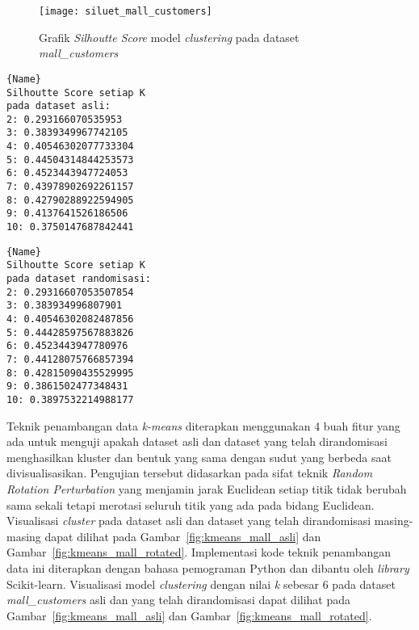 \begin{figure}
	\centering
	\texttt{[image: siluet\_mall\_customers]}
	\caption{Grafik \textit{Silhoutte Score} model \textit{clustering} pada dataset \textit{mall\_customers}}
	\label{fig:siluet_mall_customers}
\end{figure}
	
\noindent\begin{minipage}{.46\textwidth}
\begin{lstlisting}[caption=Silhoutte Score Asli,frame=tlrb, label=mall_customers_siluet_asli]{Name}
Silhoutte Score setiap K
pada dataset asli: 
2: 0.293166070535953
3: 0.3839349967742105
4: 0.40546302077733304
5: 0.44504314844253573
6: 0.4523443947724053
7: 0.43978902692261157
8: 0.42790288922594905
9: 0.4137641526186506
10: 0.3750147687842441
\end{lstlisting}
\end{minipage}\hfill
\begin{minipage}{.46\textwidth}
\begin{lstlisting}[caption=Silhoutte Score Randomisasi,frame=tlrb, label=mall_customers_siluet_randomisasi]{Name}
Silhoutte Score setiap K
pada dataset randomisasi: 
2: 0.29316607053507854
3: 0.383934996807901
4: 0.40546302082487856
5: 0.44428597567883826
6: 0.4523443947780976
7: 0.44128075766857394
8: 0.42815090435529995
9: 0.3861502477348431
10: 0.3897532214988177
\end{lstlisting}
\end{minipage}

Teknik penambangan data \textit{k-means} diterapkan menggunakan 4 buah fitur yang ada untuk menguji apakah dataset asli dan dataset yang telah dirandomisasi menghasilkan kluster dan bentuk yang sama dengan sudut yang berbeda saat divisualisasikan. Pengujian tersebut didasarkan pada sifat teknik \textit{Random Rotation Perturbation} yang menjamin jarak Euclidean setiap titik tidak berubah sama sekali tetapi merotasi seluruh titik yang ada pada bidang Euclidean. Visualisasi \textit{cluster} pada dataset asli dan dataset yang telah dirandomisasi masing-masing dapat dilihat pada Gambar~\ref{fig:kmeans_mall_asli} dan Gambar~\ref{fig:kmeans_mall_rotated}. Implementasi kode teknik penambangan data ini diterapkan dengan bahasa pemograman Python dan dibantu oleh \textit{library} Scikit-learn. Visualisasi model \textit{clustering} dengan nilai \textit{k} sebesar 6 pada dataset \textit{mall\_customers} asli dan yang telah dirandomisasi dapat dilihat pada Gambar~\ref{fig:kmeans_mall_asli} dan Gambar~\ref{fig:kmeans_mall_rotated}. 

